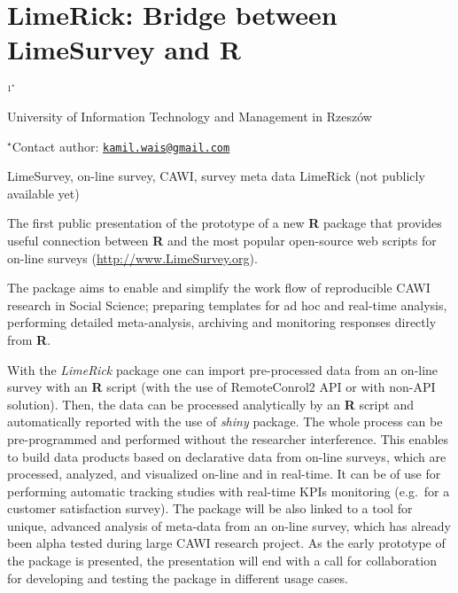\documentclass[\main/boa.tex]{subfiles}
\begin{document}
\section{LimeRick: Bridge between LimeSurvey and R}

\begin{center}
  {\bf {}$^{1^\star}$}
\end{center}

\vskip 0.3cm

\begin{affiliations}
\begin{enumerate}
\begin{minipage}{0.915\textwidth}
\centering
\item University of Information Technology and Management in Rzeszów \\[-2pt]
\end{minipage}
\end{enumerate}
$^\star$Contact author: \href{mailto:kamil.wais@gmail.com}{\nolinkurl{kamil.wais@gmail.com}}\\
\end{affiliations}

\vskip 0.5cm

\begin{minipage}{0.915\textwidth}
\keywords LimeSurvey, on-line survey, CAWI, survey meta data
\packages LimeRick (not publicly available yet)
\end{minipage}

\vskip 0.8cm

The first public presentation of the prototype of a new \textbf{R}
package that provides useful connection between \textbf{R} and the most
popular open-source web scripts for on-line surveys
(\url{http://www.LimeSurvey.org}).

The package aims to enable and simplify the work flow of reproducible
CAWI research in Social Science; preparing templates for ad hoc and
real-time analysis, performing detailed meta-analysis, archiving and
monitoring responses directly from \textbf{R}.

With the \emph{LimeRick} package one can import pre-processed data from
an on-line survey with an \textbf{R} script (with the use of
RemoteConrol2 API or with non-API solution). Then, the data can be
processed analytically by an \textbf{R} script and automatically
reported with the use of \emph{shiny} package. The whole process can be
pre-programmed and performed without the researcher interference. This
enables to build data products based on declarative data from on-line
surveys, which are processed, analyzed, and visualized on-line and in
real-time. It can be of use for performing automatic tracking studies
with real-time KPIs monitoring (e.g.~for a customer satisfaction
survey). The package will be also linked to a tool for unique, advanced
analysis of meta-data from an on-line survey, which has already been
alpha tested during large CAWI research project. As the early prototype
of the package is presented, the presentation will end with a call for
collaboration for developing and testing the package in different usage
cases.
\end{document}
